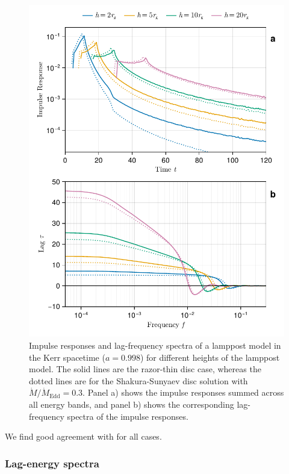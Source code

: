 \documentclass[fleqn,usenatbib]{mnras}
\begin{document}
\begin{figure}
	\centering
	\includegraphics[width=0.98\linewidth]{figures/reverberation.thin-disc.pdf}
    \caption{Impulse responses and lag-frequency spectra of a lamppost model in
        the Kerr spacetime ($a = 0.998$) for different heights of the lamppost
        model. The solid lines are the razor-thin disc case, whereas the dotted
        lines are for the Shakura-Sunyaev disc solution with $\dot{M} /
    \dot{M}_\text{Edd} = 0.3$. Panel a) shows the impulse responses summed
across all energy bands, and panel b) shows the corresponding lag-frequency
spectra of the impulse responses. }
	\label{fig:reverberation-thin}
\end{figure}

We find good agreement with \cite{cackett_modelling_2014} for all cases.

\subsubsection{Lag-energy spectra}
\end{document}
